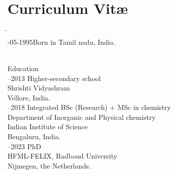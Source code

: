 \chapter{Curriculum Vit\ae}
\makeatletter
\authors{\@firstnames\ {\titleshape\@lastname}}
\makeatother

\newcommand{\fakeSection}[1]{\\[\bigskipamount]
{\normalfont\sectfont\usekomafont{section}#1}
\\[\smallskipamount]}
\begin{tabbing}
    \hspace{1em}\=\hspace{8em}\=\\
    -05-1995\>Born in Tamil nadu, India.%

    \fakeSection{Education}
    
    --2013 \> Higher-secondary school \\
    \>\> Shrishti Vidyashram\\
    \>\> Vellore, India.\\[\medskipamount]

    --2018\> Integrated BSc (Research) + MSc in chemistry \\
    \>\> Department of Inorganic and Physical chemistry \\
    \>\> Indian Institute of Science \\
    \>\> Bengaluru, India.\\[\medskipamount]
    
    --2023\> PhD \\
    \>\> HFML-FELIX, Radboud University \\
    \>\> Nijmegen, the Netherlands.\\[\medskipamount]
    
\end{tabbing}
